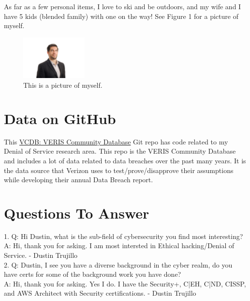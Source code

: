 As far as a few personal items, I love to ski and be outdoors, and my wife and I have 5 kids (blended family) with one on the way! See Figure 1 for a picture of myself.

\begin{figure}[H]
\centering
\includegraphics[width=0.3\textwidth]{trujillo.jpg}
\caption{\label{fig:Me}This is a picture of myself.}
\end{figure}


\section{Data on GitHub}
This \href{https://github.com/vz-risk/VCDB}{VCDB: VERIS Community Database} Git repo has code related to my Denial of Service research area. This repo is the VERIS Community Database and includes a lot of data related to data breaches over the past many years. It is the data source that Verizon uses to test/prove/disapprove their assumptions while developing their annual Data Breach report.

\section{Questions To Answer}
1. Q: Hi Dustin, what is the sub-field of cybersecurity you find most interesting?
\\
A: Hi, thank you for asking. I am most intersted in Ethical hacking/Denial of Service. - Dustin Trujillo
\\
2. Q: Dustin, I see you have a diverse background in the cyber realm, do you have certs for some of the background work you have done?
\\
A: Hi, thank you for asking. Yes I do. I have the Security+, C|EH, C|ND, CISSP, and AWS Architect with Security certifications. - Dustin Trujillo

%

